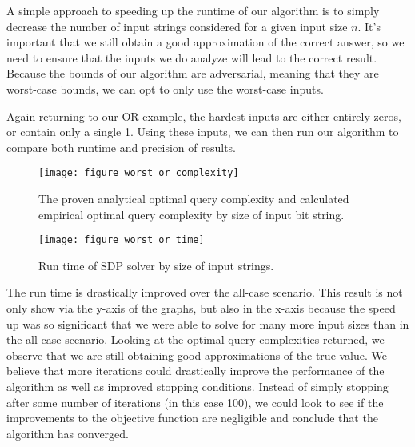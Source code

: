 A simple approach to speeding up the runtime of our
algorithm is to simply decrease the number of input
strings considered for a given input size $n$. It's
important that we still obtain a good approximation
of the correct answer, so we need to ensure that the
inputs we do analyze will lead to the correct result.
Because the bounds of our algorithm are adversarial,
meaning that they are worst-case bounds, we can opt
to only use the worst-case inputs.

Again returning to our OR example, the hardest inputs are either entirely zeros, or contain only a single 1. Using these inputs, we can then run our algorithm to compare both runtime and precision of results.

\begin{figure}[ht]
\centering
\texttt{[image: figure\_worst\_or\_complexity]}
\caption{The proven analytical optimal query complexity
and calculated empirical optimal query complexity by 
size of input bit string.}
\end{figure}

\begin{figure}[ht]
\centering
\texttt{[image: figure\_worst\_or\_time]}
\caption{Run time of SDP solver by size of input strings.}
\end{figure}

The run time is drastically improved over the all-case scenario. This result is not only show via the y-axis of the graphs, but also in the x-axis because the speed up was so significant that we were able to solve for many more input sizes than in the all-case scenario. 
Looking at the optimal query complexities returned, we observe that we are still obtaining good approximations of the true value. We believe that more iterations could drastically improve the performance of the algorithm as well as improved stopping conditions. Instead of simply stopping after some number of iterations (in this case 100), we could look to see if the improvements to the objective function are negligible and conclude that the algorithm has converged.
